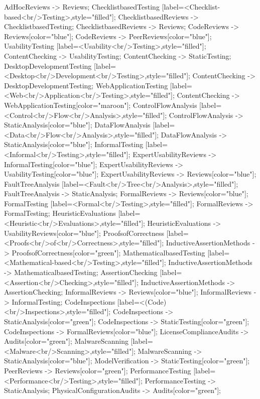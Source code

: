 \documentclass{article}
\begin{document}
{AdHocReviews -> Reviews;
ChecklistbasedTesting [label=<Checklist-based<br/>Testing>,style="filled"];
ChecklistbasedReviews -> ChecklistbasedTesting;
ChecklistbasedReviews -> Reviews;
CodeReviews -> Reviews[color="blue"];
CodeReviews -> PeerReviews[color="blue"];
UsabilityTesting [label=<Usability<br/>Testing>,style="filled"];
ContentChecking -> UsabilityTesting;
ContentChecking -> StaticTesting;
DesktopDevelopmentTesting [label=<Desktop<br/>Development<br/>Testing>,style="filled"];
ContentChecking -> DesktopDevelopmentTesting;
WebApplicationTesting [label=<Web<br/>Application<br/>Testing>,style="filled"];
ContentChecking -> WebApplicationTesting[color="maroon"];
ControlFlowAnalysis [label=<Control<br/>Flow<br/>Analysis>,style="filled"];
ControlFlowAnalysis -> StaticAnalysis[color="blue"];
DataFlowAnalysis [label=<Data<br/>Flow<br/>Analysis>,style="filled"];
DataFlowAnalysis -> StaticAnalysis[color="blue"];
InformalTesting [label=<Informal<br/>Testing>,style="filled"];
ExpertUsabilityReviews -> InformalTesting[color="blue"];
ExpertUsabilityReviews -> UsabilityTesting[color="blue"];
ExpertUsabilityReviews -> Reviews[color="blue"];
FaultTreeAnalysis [label=<Fault<br/>Tree<br/>Analysis>,style="filled"];
FaultTreeAnalysis -> StaticAnalysis;
FormalReviews -> Reviews[color="blue"];
FormalTesting [label=<Formal<br/>Testing>,style="filled"];
FormalReviews -> FormalTesting;
HeuristicEvaluations [label=<Heuristic<br/>Evaluations>,style="filled"];
HeuristicEvaluations -> UsabilityReviews[color="blue"];
ProofsofCorrectness [label=<Proofs<br/>of<br/>Correctness>,style="filled"];
InductiveAssertionMethods -> ProofsofCorrectness[color="green"];
MathematicalbasedTesting [label=<Mathematical-based<br/>Testing>,style="filled"];
InductiveAssertionMethods -> MathematicalbasedTesting;
AssertionChecking [label=<Assertion<br/>Checking>,style="filled"];
InductiveAssertionMethods -> AssertionChecking;
InformalReviews -> Reviews[color="blue"];
InformalReviews -> InformalTesting;
CodeInspections [label=<(Code)<br/>Inspections>,style="filled"];
CodeInspections -> StaticAnalysis[color="green"];
CodeInspections -> StaticTesting[color="green"];
CodeInspections -> FormalReviews[color="blue"];
LicenseComplianceAudits -> Audits[color="green"];
MalwareScanning [label=<Malware<br/>Scanning>,style="filled"];
MalwareScanning -> StaticAnalysis[color="blue"];
ModelVerification -> StaticTesting[color="green"];
PeerReviews -> Reviews[color="green"];
PerformanceTesting [label=<Performance<br/>Testing>,style="filled"];
PerformanceTesting -> StaticAnalysis;
PhysicalConfigurationAudits -> Audits[color="green"];
}
\end{document}
